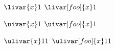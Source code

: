 \documentclass[minimal]{omdoc}
\begin{document}
$\livar{x}1$ $\livar[foo]{x}1$

$\uivar{x}1$ $\uivar[foo]{x}1$

$\ulivar{x}11$ $\ulivar[foo]{x}11$
\end{document}

